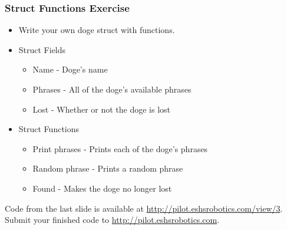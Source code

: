 \documentclass{beamer}
\begin{document}
\begin{frame}[fragile]
  \frametitle{Struct Functions Exercise}

  \begin{itemize}
    \item Write your own doge struct with functions.
    \item Struct Fields
      \begin{itemize}
        \item Name - Doge's name
        \item Phrases - All of the doge's available phrases
        \item Lost - Whether or not the doge is lost
      \end{itemize}
    \item Struct Functions
      \begin{itemize}
        \item Print phrases - Prints each of the doge's phrases
        \item Random phrase - Prints a random phrase
        \item Found - Makes the doge no longer lost
      \end{itemize}
  \end{itemize}

  Code from the last slide is available at
  \url{http://pilot.eshsrobotics.com/view/3}. Submit your finished code to
  \url{http://pilot.eshsrobotics.com}.
\end{frame}
\end{document}
